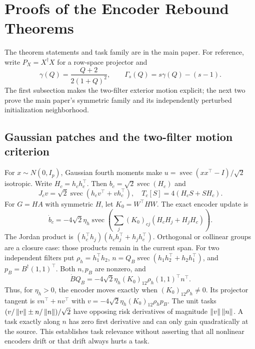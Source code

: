 \section{Proofs of the Encoder Rebound Theorems}
\label{supp:core-proofs}
The theorem statements and task family are in the main paper. For reference, write $P_X=X^\dagger X$ for a row-space projector and
\begin{equation}
 \gamma(Q)=\frac{Q+2}{2(1+Q)^2},\qquad
 \Gamma_s(Q)=s\gamma(Q)-(s-1).
\end{equation}
The first subsection makes the two-filter exterior motion explicit; the next two prove the main paper's symmetric family and its independently perturbed initialization neighborhood.

\subsection{Gaussian patches and the two-filter motion criterion}
For $x\sim N(0,I_p)$, Gaussian fourth moments make $u=\operatorname{svec}(xx^\top-I)/\sqrt2$ isotropic. Write $H_c=h_ch_c^\top$. Then $b_c=\sqrt2\operatorname{svec}(H_c)$ and
\begin{equation}
 J_cv=\sqrt2\operatorname{svec}(h_cv^\top+vh_c^\top),
 \quad T_c[S]=4(H_cS+SH_c).
\end{equation}
For $G=HA$ with symmetric $H$, let $K_0=W^\top HW$. The exact encoder update is
\begin{equation}
 \dot b_c=-4\sqrt2\eta_h\operatorname{svec}
 \left(\sum_j(K_0)_{cj}(H_cH_j+H_jH_c)\right).
\end{equation}
The Jordan product is $(h_c^\top h_j)(h_ch_j^\top+h_jh_c^\top)$. Orthogonal or collinear groups are a closure case: those products remain in the current span. For two independent filters put $\rho_h=h_1^\top h_2$, $n=Q_B\operatorname{svec}(h_1h_2^\top+h_2h_1^\top)$, and $p_B=B^\dagger(1,1)^\top$. Both $n,p_B$ are nonzero, and
\begin{equation}
 \dot BQ_B=-4\sqrt2\eta_h(K_0)_{12}\rho_h(1,1)^\top n^\top.
\end{equation}
Thus, for $\eta_h>0$, the encoder moves exactly when $(K_0)_{12}\rho_h\ne0$. Its projector tangent is $vn^\top+nv^\top$ with $v=-4\sqrt2\eta_h(K_0)_{12}\rho_hp_B$. The unit tasks $(v/\left\lVert v\right\rVert\pm n/\left\lVert n\right\rVert)/\sqrt2$ have opposing risk derivatives of magnitude $\left\lVert v\right\rVert\left\lVert n\right\rVert$. A task exactly along $n$ has zero first derivative and can only gain quadratically at the source. This establishes task relevance without asserting that all nonlinear encoders drift or that drift always hurts a task.

